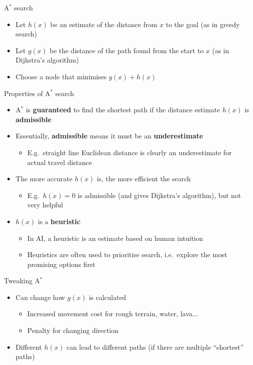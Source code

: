\begin{frame}{A$^*$ search}
    \begin{itemize}
    	\pause\item Let $h(x)$ be an estimate of the distance from $x$ to the goal (as in greedy search)
    	\pause\item Let $g(x)$ be the distance of the path found from the start to $x$ (as in Dijkstra's algorithm)
    	\pause\item Choose a node that minimises $g(x) + h(x)$
    \end{itemize}
\end{frame}

\begin{frame}{Properties of A$^*$ search}
    \begin{itemize}
        \item A$^*$ is \textbf{guaranteed} to find the shortest path
            if the distance estimate $h(x)$ is \textbf{admissible} \pause
        \item Essentially, \textbf{admissible} means it must be an \textbf{underestimate} \pause
            \begin{itemize}
                \item E.g.\ straight line Euclidean distance is clearly an underestimate
                    for actual travel distance \pause
            \end{itemize}
        \item The more accurate $h(x)$ is, the more efficient the search \pause
            \begin{itemize}
                \item E.g.\ $h(x) = 0$ is admissible (and gives Dijkstra's algorithm), but not very helpful \pause
            \end{itemize}
        \item $h(x)$ is a \textbf{heuristic} \pause
            \begin{itemize}
                \item In AI, a heuristic is an estimate based on human intuition \pause
                \item Heuristics are often used to prioritise search,
                    i.e.\ explore the most promising options first
            \end{itemize}
    \end{itemize}
\end{frame}

\begin{frame}{Tweaking A$^*$}
	\begin{itemize}
		\pause\item Can change how $g(x)$ is calculated
			\begin{itemize}
				\pause\item Increased movement cost for rough terrain, water, lava...
				\pause\item Penalty for changing direction
			\end{itemize}
		\pause\item Different $h(x)$ can lead to different paths (if there are multiple ``shortest'' paths)
	\end{itemize}
\end{frame}


